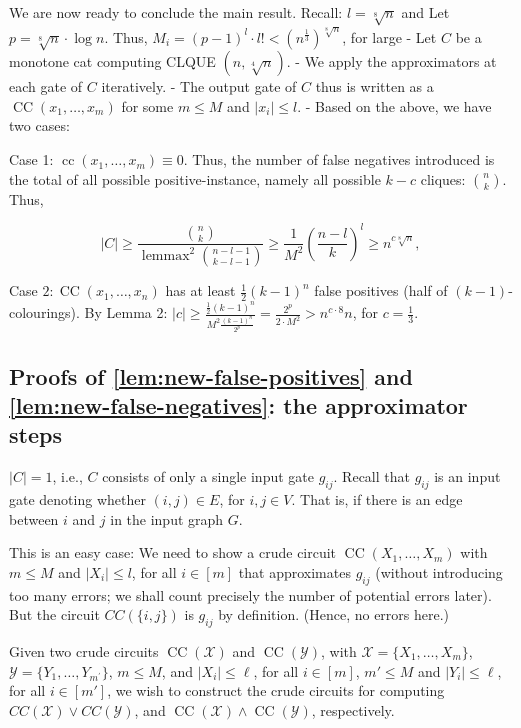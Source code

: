 We are now ready to conclude the main result.
Recall: $l=\sqrt[8]{n}$ and
Let $p=\sqrt[8]{n} \cdot \log n$. Thus, $M_i=(p-1)^l \cdot l!<\left(n^{\frac{1}{3}}\right)^{\sqrt[8]{n}}$, for large
- Let $C$ be a monotone cat computing CLQUE $(n, \sqrt[4]{n})$.
- We apply the approximators at each gate of $C$ iteratively.
- The output gate of $C$ thus is written as a $\operatorname{CC}\left(x_1, \ldots, x_m\right)$ for some $m \leqslant M$ and $\left|x_i\right| \leqslant l$.
- Based on the above, we have two cases:

Case 1: $\operatorname{cc}\left(x_1, \ldots, x_m\right) \equiv 0$.
Thus, the number of false negatives introduced is the total of all possible positive-instance, namely all possible $k-c$ cliques: $\binom{n}{k}$.
Thus,

$$
|C| \geq \frac{\binom{n}{k}}{\operatorname{lemmax}^2\binom{n-l-1}{k-l-1}} \geq \frac{1}{M^2}\left(\frac{n-l}{k}\right)^l \geq n^{c \sqrt[8]{n}},
$$


Case $2: \operatorname{CC}\left(x_1, \ldots, x_n\right)$ has at least $\frac{1}{2}(k-1)^n$ false positives (half of $(k-1)$-colourings).
By Lemma 2: $|c| \geq \frac{\frac{1}{2}(k-1)^n}{M^2 \frac{(k-1)^n}{2^p}}=\frac{2^p}{2 \cdot M^2}>n^{c \cdot 8} n$, for $c=\frac{1}{3}$.




\subsection{Proofs of \cref{lem:new-false-positives} and \cref{lem:new-false-negatives}:  the approximator steps }
 $|C|=1$, i.e., $C$ consists of only a single input gate $g_{ij}$. Recall that $g_{i j}$ is an input gate denoting whether $(i, j) \in E$, for $i, j \in V$.
That is, if there is an edge between $i$ and $j$ in the input graph $G$.

This is an easy case: We need to show a crude circuit $\operatorname{CC}(X_1, \ldots, X_m)$ with $m \leq M$ and $\left|X_i\right| \leqslant l$, for all $i \in[m]$ that approximates $g_{i j}$ (without introducing too many errors; we shall count precisely the number of potential errors later).
But the circuit $C C(\{i, j\})$ is $g_{i j}$ by definition. (Hence, no errors here.)





Given two crude circuits
$\operatorname{CC}(\mathcal X)$ and 
$\operatorname{CC}(\mathcal Y) 
$, with $\mathcal{X}=\{X_1, \ldots, X_m\}$, 
$\mathcal{Y}=\{Y_1, \ldots, Y_{m^{\prime}}\}$, $m\le M$, and $\left|X_i\right| \leq \ell $, for all $i\in[m]$, $m'\le M $ and $\left|Y_i\right| \leq \ell$, for all $i\in[m']$, we wish to construct the  crude circuits  for computing $CC(\mathcal{X}) \vee CC(\mathcal{Y})$, and $\operatorname{CC}(\mathcal X) \wedge 
\operatorname{CC}(\mathcal Y)$, respectively.

